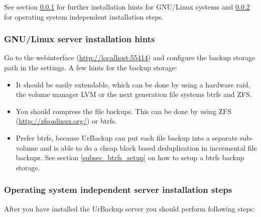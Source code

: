 \documentclass[a4paper,10pt]{article}
\begin{document}
\noindent See section \ref{gnu_linux_installation_hints} for further installation hints for GNU/Linux systems and \ref{os_independent_installation_steps} for operating system independent installation steps.

\subsubsection{GNU/Linux server installation hints}
\label{gnu_linux_installation_hints}

Go to the webinterface (\url{http://localhost:55414}) and configure the backup storage path in the settings. A few hints for the backup storage:
\begin{itemize}
  \item It should be easily extendable, which can be done by using a hardware raid, the volume manager LVM or the next generation file systems btrfs and ZFS.
  \item You should compress the file backups. This can be done by using ZFS (\url{http://zfsonlinux.org/}) or btrfs.
  \item Prefer btrfs, because UrBackup can put each file backup into a separate sub-volume and is able to do a cheap block based deduplication in incremental file backups. See section \ref{subsec_btrfs_setup} on how to setup a btrfs backup storage.
\end{itemize}

\subsubsection{Operating system independent server installation steps}
\label{os_independent_installation_steps}

After you have installed the UrBackup server you should perform following steps:
\end{document}
